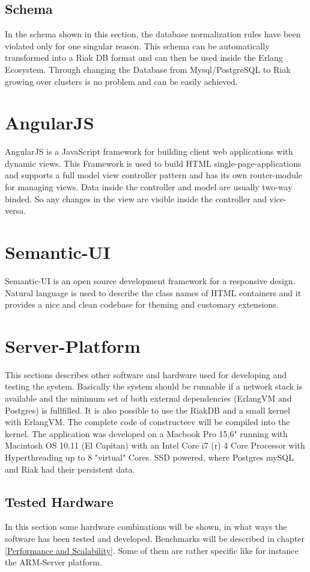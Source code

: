 \subsection{Schema}
In the schema shown in this section, the database normalization rules have been violated only for one singular reason. This schema can be automatically transformed into a Riak DB format and can then be used inside the Erlang Ecosystem. Through changing the Database from Mysql/PostgreSQL to Riak growing over clusters is no problem and can be easily achieved.

\section{AngularJS}
AngularJS is a JavaScript framework for building client web applications with dynamic views. This Framework is used to build HTML single-page-applications and supports a full model view controller pattern and has its own router-module for managing views. Data inside the controller and model are usually two-way binded. So any changes in the view are visible inside the controller and vice-versa.
\section{Semantic-UI}
Semantic-UI is an open source development framework for a responsive design. Natural language is used to describe the class names of HTML containers and it provides a nice and clean codebase for theming and customary extensions. 
\section{Server-Platform}
This sections describes other software and hardware used for developing and testing the system. Basically the system should be runnable if a network stack is available and the minimum set of both external dependencies (ErlangVM and Postgres) is fullfilled. 
It is also possible to use the RiakDB and a small kernel with ErlangVM. The complete code of constructeev will be compiled into the kernel.
\newline
The application was developed on a Macbook Pro 15,6" running with Macintosh OS 10.11 (El Capitan) with an Intel Core i7 (r) 4 Core Processor with Hyperthreading up to 8 "virtual" Cores. SSD powered, where Postgres mySQL and Riak had their persistent data. 

\subsection{Tested Hardware}
In this section some hardware combinations will be shown, in what ways the software has been tested and developed. Benchmarks will be described in chapter \ref{Performance and Scalability}. Some of them are rather specific like for instance the ARM-Server platform. 

